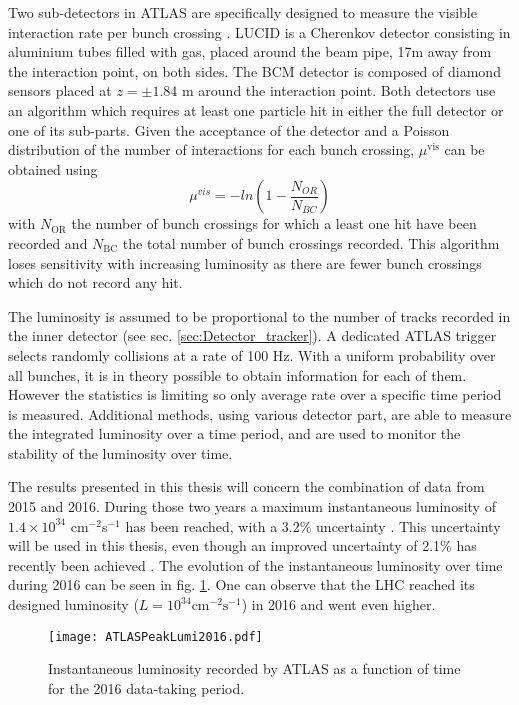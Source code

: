 Two sub-detectors in ATLAS are specifically designed to measure the visible interaction rate per bunch crossing \cite{CERN-EP-2016-117}.
LUCID is a Cherenkov detector consisting in aluminium tubes filled with gas, placed around the beam pipe, 17m away from the interaction point, on both sides.
The BCM detector is composed of diamond sensors placed at $z=\pm 1.84$ m around the interaction point.
Both detectors use an algorithm which requires at least one particle hit in either the full detector or one of its sub-parts.
Given the acceptance of the detector and a Poisson distribution of the number of interactions for each bunch crossing, $\mu^{\text{vis}}$ can be obtained using \cite{Grafstrom:2015foa}
\begin{equation}
\mu^{vis} = -ln( 1-\frac{N_{OR}}{N_{BC}})
\end{equation}
with $N_{\text{OR}}$ the number of bunch crossings for which a least one hit have been recorded and $N_\text{BC}$ the total number of bunch crossings recorded.
This algorithm loses sensitivity with increasing luminosity as there are fewer bunch crossings which do not record any hit.

The luminosity is assumed to be proportional to the number of tracks recorded in the inner detector (see sec. \ref{sec:Detector_tracker}).
A dedicated ATLAS trigger selects randomly collisions at a rate of 100 Hz.
With a uniform probability over all bunches, it is in theory possible to obtain information for each of them.
However the statistics is limiting so only average rate over a specific time period is measured.
Additional methods, using various detector part, are able to measure the integrated luminosity over a time period, and are used to monitor the stability of the luminosity over time.

The results presented in this thesis will concern the combination of data from 2015 and 2016.
During those two years a maximum instantaneous luminosity of $1.4\times 10^{34}$ cm$^{-2}$s$^{-1}$ has been reached, with a 3.2\% uncertainty \cite{luminosityForPhysics,ATL-COM-PHYS-2016-1784}.
This uncertainty will be used in this thesis, even though an improved uncertainty of 2.1\% has recently been achieved \cite{luminosityForPhysics}.
The evolution of the instantaneous luminosity over time during 2016 can be seen in fig. \ref{fig:org729acd8}.
One can observe that the LHC reached its designed luminosity ($L=10^{34} \text{cm}^{-2} \text{s}^{-1}$) in 2016 and went even higher.

\begin{figure}[htbp]
\centering
\texttt{[image: ATLASPeakLumi2016.pdf]}
\caption{\label{fig:org729acd8}
Instantaneous luminosity recorded by ATLAS as a function of time for the 2016 data-taking period.\cite{ATLASPublicLumiRun2}}
\end{figure}


